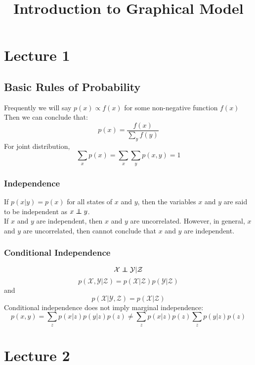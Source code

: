 \documentclass[12pt,a4paper]{article}
\title{Introduction to Graphical Model}
\newcommand\independent{\protect\mathpalette{\protect\independenT}{\perp}}
\def\independenT#1#2{\mathrel{\rlap{$#1#2$}\mkern2mu{#1#2}}}
\begin{document}
 

\baselineskip24pt
\maketitle 

\section{Lecture 1}
\subsection*{Basic Rules of Probability}
Frequently we will say $p(x) \propto f(x)$ for some non-negative function $f(x)$\\
Then we can conclude that:
$$
p(x) = \frac{f(x)}{\sum_{y}f(y)}
$$
For joint distribution,
$$
\sum_{x}p(x) = \sum_{x}\sum_{y}p(x,y)=1
$$
\subsubsection*{Independence}
If $p(x|y)=p(x)$ for all states of $x$ and $y$, then the variables $x$ and $y$ are said to be independent as $x \independent y$.\\
If $x$ and $y$ are independent, then $x$ and $y$ are uncorrelated. However, in general, $x$ and $y$ are uncorrelated, then cannot conclude that $x$ and $y$ are independent.\\
\subsubsection*{Conditional Independence}
$$
{\mathcal X} \independent {\mathcal Y}|{\mathcal Z}
$$
$$
p({\mathcal X},{\mathcal Y}|{\mathcal Z}) = p({\mathcal X} |{\mathcal Z})p({\mathcal Y}|{\mathcal Z})
$$ 
and
$$
p({\mathcal X}|{\mathcal Y},{\mathcal Z})=p({\mathcal X}|{\mathcal Z})
$$
Conditional independence does not imply marginal independence:
$$
p(x,y) = \sum_{z}p(x|z)p(y|z)p(z) \neq \sum_{z}p(x|z)p(z) \sum_{z}p(y|z)p(z)
$$
\section{Lecture 2}
\end{document}

